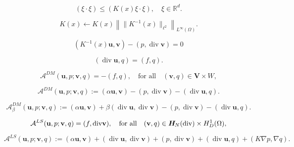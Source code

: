\documentclass[11pt]{article}
\begin{document}
\begin{equation}\label{bound_below_K}
(\xi\cdot \xi) \le  (K(x)\xi\cdot\xi), \quad \xi\in \mathbb{R}^d.   
\end{equation}

\[
K(x)\leftarrow 
K(x)\left\|\|K^{-1}(x)\|_{\ell^2}\right\|_{L^{\infty}(\Omega)}. 
\]

\begin{equation}\label{first}
(K^{-1}(x) {{\mathbf u}}, {{\mathbf v}}) - (p, {\operatorname{div}} {{\mathbf v}}) = 0
\end{equation}

\begin{equation}\label{div-eqn}
({\operatorname{div}} {{\mathbf u}}, q)=(f,q).
\end{equation}

\begin{equation}\label{eq:dual_mixed}
{{\mathcal A}}^{DM}({{\mathbf u}},p; {{\mathbf v}},q)= - (f, q),
\quad \mbox{for all}\quad ({{\mathbf v}}, q) \in {{\boldsymbol V}} \times W,
\end{equation}

\begin{equation}\label{A-form-mixed}
{{\mathcal A}}^{DM}({{\mathbf u}},p; {{\mathbf v}},q):=({{\alpha}} {{\mathbf u}}, {{\mathbf v}})
-(p, {\operatorname{div}} {{\mathbf v}}) - ({\operatorname{div}} {{\mathbf u}}, q). 
\end{equation}

$$
{{\mathcal A}}^{DM}_\beta ({{\mathbf u}},p; {{\mathbf v}},q)
:=({{\alpha}} {{\mathbf u}}, {{\mathbf v}}) + \beta ({\operatorname{div}} {{\mathbf u}}, {\operatorname{div}} {{\mathbf v}})-(p, {\operatorname{div}} {{\mathbf v}}) - ({\operatorname{div}} {{\mathbf u}}, q). 
$$

\begin{equation}\label{eq:LS}
{{\mathcal A}}^{LS}({{\mathbf u}},p; {{\mathbf v}},q)=(f, {\operatorname{div}} {{\mathbf v}}), 
\quad \mbox{for all}\quad ({{\mathbf v}}, q) \in {{\boldsymbol H}_{\hspace{-0.2mm}N}}({\operatorname{div}}) \times H^1_D({{\Omega}}),
\end{equation}

\begin{equation}\label{A-form-LS}
{{\mathcal A}}^{LS}({{\mathbf u}},p; {{\mathbf v}},q):=({{\alpha}} {{\mathbf u}}, {{\mathbf v}}) +({\operatorname{div}} {{\mathbf u}}, {\operatorname{div}} {{\mathbf v}}) + (p, {\operatorname{div}} {{\mathbf v}}) + ({\operatorname{div}} {{\mathbf u}}, q) + (K \nabla p, \nabla q).
\end{equation}
\end{document}
